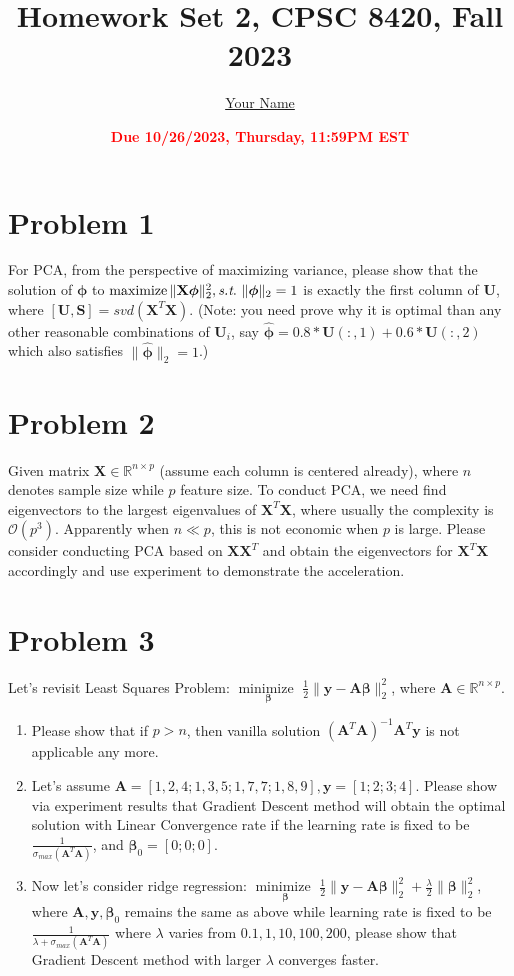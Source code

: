 \documentclass[11pt]{article}
\title{{\bf Homework Set 2, CPSC 8420, Fall 2023}} %
\author{\Large\underline{Your Name}}
\date{\textbf{\Large\textcolor{red}{Due 10/26/2023, Thursday, 11:59PM EST}}} %
\newcommand{\R}{\mathbb{R}}
\newcommand{\minimize}{\operatorname*{minimize\ }}
\newcommand{\maximize}{\operatorname*{maximize}}
\newcommand{\mtx}[1]{\mathbf{#1}}
\newcommand{\vct}[1]{\mathbf{#1}}
\def \mA {\mtx{A}}
\def \mU {\mtx{U}}
\def \mS {\mtx{S}}
\def \mX {\mtx{X}}
\def \vy {\vct{y}}
\def \R {\mathbb{R}}
\begin{document}
	\maketitle
	

	\section{Problem 1}
	For PCA, from the perspective of maximizing variance, please show that the solution of $\bm{\phi}$ to $\maximize \|\mX \bm{\phi}\|^2_2, \st \ \|\bm{\phi}\|_2=1$ is exactly the first column of $\mU$, where $[\mU,\mS]=svd(\mX^T\mX)$. (Note: you need prove why it is optimal than any other reasonable combinations of $\mU_i$, say $\hat{\bm{\phi}}=0.8*\mU(:,1)+0.6*\mU(:,2)$ which also  satisfies $\|\hat{\bm{\phi}}\|_2=1$.)
	


	
	\vspace{4cm}
	\section{Problem 2}
	Given matrix $\mX\in\R^{n\times p}$ (assume each column is centered already), where $n$ denotes sample size while $p$ feature size. To conduct PCA, we need find eigenvectors to the  largest eigenvalues of $\mX^T\mX$, where usually the complexity is $\mathcal{O}(p^3)$. Apparently when $n\ll p$, this is not economic when $p$ is large. Please consider conducting PCA based on $\mX\mX^T$ and obtain the eigenvectors for $\mX^T\mX$ accordingly and use experiment to demonstrate the acceleration.
		\vspace{5cm}
	
	
	
	
	\section{Problem 3}
	Let's revisit Least Squares Problem: $\minimize \limits_{\bm{\beta}} \frac{1}{2}\|\vy-\mA\bm{\beta}\|^2_2$, where $\mA\in\R^{n\times p}$.
	\begin{enumerate}
		\item Please show that if $p>n$, then vanilla solution $(\mA^T\mA)^{-1}\mA^T\vy$ is not applicable any more.	
		\item Let's assume $\mA=[1, 2, 4;1, 3, 5; 1, 7, 7; 1, 8, 9], \vy=[1;2;3;4]$. Please show via experiment results that Gradient Descent method will obtain the optimal solution with  Linear Convergence rate if the learning rate is fixed to be $\frac{1}{\sigma_{max}(\mA^T\mA)}$, and $\bm{\beta}_0=[0;0;0]$.	
		\item Now let's consider ridge regression: $\minimize \limits_{\bm{\beta}} \frac{1}{2}\|\vy-\mA\bm{\beta}\|^2_2+\frac{\lambda}{2} \|\bm{\beta}\|^2_2$, where  $\mA,\vy,\bm{\beta}_0$ remains the same as above while learning rate is fixed to be $\frac{1}{\lambda+\sigma_{max}(\mA^T\mA)}$ where $\lambda$ varies from $0.1,1,10,100,200$, please show that Gradient Descent method with larger $\lambda$ converges faster. 
	\end{enumerate}
	\vspace{2.5cm}
	
\end{document}
